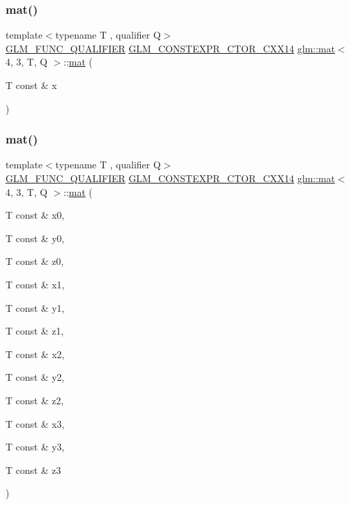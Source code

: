 \subsubsection{\texorpdfstring{mat()}{mat()}\hspace{0.1cm}{\footnotesize\ttfamily [4/21]}}
{\footnotesize\ttfamily template$<$typename T , qualifier Q$>$ \\
\mbox{\hyperlink{setup_8hpp_a33fdea6f91c5f834105f7415e2a64407}{G\+L\+M\+\_\+\+F\+U\+N\+C\+\_\+\+Q\+U\+A\+L\+I\+F\+I\+ER}} \mbox{\hyperlink{setup_8hpp_a0900f9145e68bf6061b6f5e7be3fa751}{G\+L\+M\+\_\+\+C\+O\+N\+S\+T\+E\+X\+P\+R\+\_\+\+C\+T\+O\+R\+\_\+\+C\+X\+X14}} \mbox{\hyperlink{structglm_1_1mat}{glm\+::mat}}$<$ 4, 3, T, Q $>$\+::\mbox{\hyperlink{structglm_1_1mat}{mat}} (\begin{DoxyParamCaption}\item[{T const \&}]{x }\end{DoxyParamCaption})\hspace{0.3cm}{\ttfamily [explicit]}}

\mbox{\label{structglm_1_1mat_3_014_00_013_00_01_t_00_01_q_01_4_a2bb46396e51e502b05ba91e5a3602e04}} 
\subsubsection{\texorpdfstring{mat()}{mat()}\hspace{0.1cm}{\footnotesize\ttfamily [5/21]}}
{\footnotesize\ttfamily template$<$typename T , qualifier Q$>$ \\
\mbox{\hyperlink{setup_8hpp_a33fdea6f91c5f834105f7415e2a64407}{G\+L\+M\+\_\+\+F\+U\+N\+C\+\_\+\+Q\+U\+A\+L\+I\+F\+I\+ER}} \mbox{\hyperlink{setup_8hpp_a0900f9145e68bf6061b6f5e7be3fa751}{G\+L\+M\+\_\+\+C\+O\+N\+S\+T\+E\+X\+P\+R\+\_\+\+C\+T\+O\+R\+\_\+\+C\+X\+X14}} \mbox{\hyperlink{structglm_1_1mat}{glm\+::mat}}$<$ 4, 3, T, Q $>$\+::\mbox{\hyperlink{structglm_1_1mat}{mat}} (\begin{DoxyParamCaption}\item[{T const \&}]{x0,  }\item[{T const \&}]{y0,  }\item[{T const \&}]{z0,  }\item[{T const \&}]{x1,  }\item[{T const \&}]{y1,  }\item[{T const \&}]{z1,  }\item[{T const \&}]{x2,  }\item[{T const \&}]{y2,  }\item[{T const \&}]{z2,  }\item[{T const \&}]{x3,  }\item[{T const \&}]{y3,  }\item[{T const \&}]{z3 }\end{DoxyParamCaption})}

